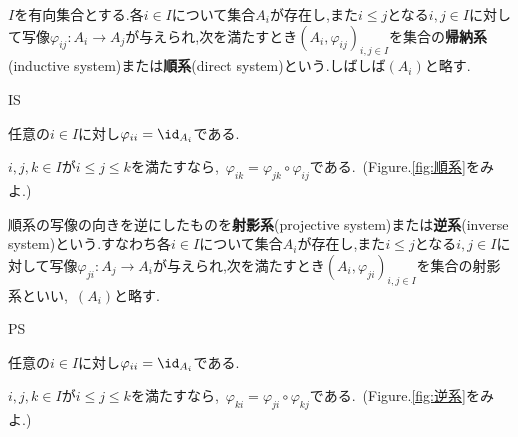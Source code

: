 \begin{defi}[帰納系]
	$I$を有向集合とする.各$i\in I$について集合$A_i$が存在し,また$i\leq j$となる$i,j\in I$に対して写像$\varphi_{ij}:A_i\to A_j$が与えられ,次を満たすとき$(A_i,\varphi_{ij})_{i,j\in I}$を集合の\textbf{帰納系}(inductive system)または\textbf{順系}(direct system)という.しばしば$(A_i)$と略す.
	\begin{defiterm}{IS}
		\item 任意の$i\in I$に対し$\varphi_{ii}=\id_{A_i}$である.
		\item $i,j,k\in I$が$i\leq j\leq k$を満たすなら,~$\varphi_{ik}=\varphi_{jk}\circ\varphi_{ij}$である.~(Figure.\ref{fig:順系}をみよ.)
	\end{defiterm}
\end{defi}

\begin{defi}[射影系]
	順系の写像の向きを逆にしたものを\textbf{射影系}(projective system)または\textbf{逆系}(inverse system)という.すなわち各$i\in I$について集合$A_i$が存在し,また$i\leq j$となる$i,j\in I$に対して写像$\varphi_{ji}:A_j\to A_i$が与えられ,次を満たすとき$(A_i,\varphi_{ji})_{i,j\in I}$を集合の射影系といい,~$(A_i)$と略す.
	\begin{defiterm}{PS}
		\item 任意の$i\in I$に対し$\varphi_{ii}=\id_{A_i}$である.
		\item $i,j,k\in I$が$i\leq j\leq k$を満たすなら,~$\varphi_{ki}=\varphi_{ji}\circ\varphi_{kj}$である.~(Figure.\ref{fig:逆系}をみよ.)
	\end{defiterm}
\end{defi}

